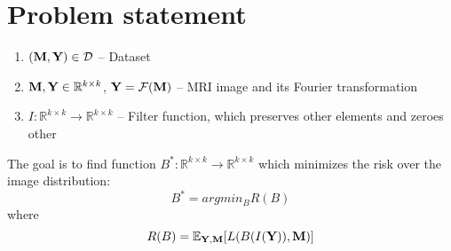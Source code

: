 \documentclass{article}
\begin{document}
\section{Problem statement}
\begin{enumerate}
    \item $(\textbf M, \textbf Y) \in \mathcal{D}$ -- Dataset
    \item $\textbf M, \textbf Y \in \mathbb{R}^{k \times k}$, $\textbf Y=\mathcal{F}(\textbf M)$ -- MRI image and its Fourier transformation
    \item $I: \mathbb{R}^{k \times k} \longrightarrow \mathbb{R}^{k \times k}$ -- Filter function, which preserves other elements and zeroes other
\end{enumerate}
The goal is to find function $B^*: \mathbb{R}^{k \times k} \longrightarrow \mathbb{R}^{k \times k}$ which minimizes the risk over the image distribution:
\[B^* = argmin_B R(B)\] where
 \[ R(B)= \mathbb{E}_{\textbf Y, \textbf M}[L(B(I(\textbf Y)), \textbf M)]\]








\end{document}
